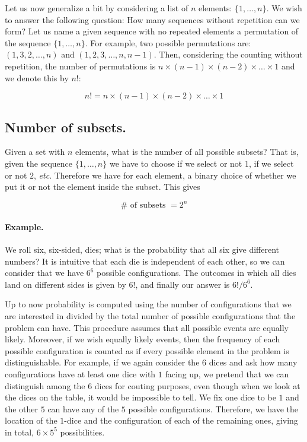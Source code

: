\documentclass[12pt]{article}
\begin{document}
Let us now generalize a bit by considering a list of $n$ elements: $\{ 1, \ldots, n \}$.
We wish to answer the following question: How many sequences without repetition can we form?
Let us name a given sequence with no repeated elements a permutation of the sequence $\{1, \ldots, n \}$.
For example, two possible permutations are: $(1, 3, 2, \ldots, n )$ and $(1, 2, 3, \ldots, n, n - 1)$.
Then, considering the counting without repetition, the number of permutations is 
$n \times (n - 1) \times (n - 2) \times \ldots \times 1$ and we denote this by $n!$:

\begin{equation}
n! = n \times (n - 1) \times (n - 2) \times \ldots \times 1
\end{equation}

\subsection{Number of subsets.}

Given a set with $n$ elements, what is the number of all possible subsets?
That is, given the sequence $\{1, \ldots, n\}$ we have to choose if we select or not
$1$, if we select or not $2$, \textit{etc}.
Therefore we have for each element, a binary choice of whether we put it or not the element inside the subset.
This gives

\begin{equation}
\# \mbox{ of subsets } =
2^{n}
\end{equation}

\paragraph{Example.}
We roll six, six-sided, dies; what is the probability that all six give different numbers?
It is intuitive that each die is independent of each other, so we can consider that we have 
$6^{6}$ possible configurations. 
The outcomes in which all dies land on different sides is given by 
$6!$, and finally our answer is $ 6! / 6^{6}$.

\vspace{.5cm}
Up to now probability is computed using the number of configurations that we are interested in divided
by the total number of possible configurations that the problem can have. 
This procedure assumes that all possible events are equally likely.
Moreover, if we wish equally likely events, then the frequency of each possible configuration is 
counted as if every possible element in the problem is distinguishable.
For example, if we again consider the $6$ dices and ask how many configurations have at least one dice with $1$
facing up, we pretend that we can distinguish among the $6$ dices for couting purposes, even though
when we look at the dices on the table, it would be impossible to tell.
We fix one dice to be $1$ and the other $5$ can have any of the $5$ possible configurations.
Therefore, we have the location of the $1$-dice and the configuration of each of the remaining
ones, giving in total, $6 \times 5^{5}$ possibilities.
\end{document}
